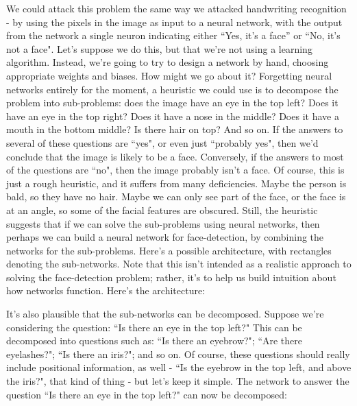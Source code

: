 We could attack this problem the same way we attacked handwriting recognition - by using the pixels in the image as input to a neural network, with the output from the network a single neuron indicating either ``Yes, it's a face'' or ``No, it's not a face".
Let's suppose we do this, but that we're not using a learning algorithm. Instead, we're going to try to design a network by hand, choosing appropriate weights and biases. How might we go about it? Forgetting neural networks entirely for the moment, a heuristic we could use is to decompose the problem into sub-problems: does the image have an eye in the top left? Does it have an eye in the top right? Does it have a nose in the middle? Does it have a mouth in the bottom middle? Is there hair on top? And so on.
If the answers to several of these questions are ``yes", or even just ``probably yes", then we'd conclude that the image is likely to be a face. Conversely, if the answers to most of the questions are ``no", then the image probably isn't a face.
Of course, this is just a rough heuristic, and it suffers from many deficiencies. Maybe the person is bald, so they have no hair. Maybe we can only see part of the face, or the face is at an angle, so some of the facial features are obscured. Still, the heuristic suggests that if we can solve the sub-problems using neural networks, then perhaps we can build a neural network for face-detection, by combining the networks for the sub-problems. Here's a possible architecture, with rectangles denoting the sub-networks. Note that this isn't intended as a realistic approach to solving the face-detection problem; rather, it's to help us build intuition about how networks function. Here's the architecture:

It's also plausible that the sub-networks can be decomposed. Suppose we're considering the question: ``Is there an eye in the top left?" This can be decomposed into questions such as: ``Is there an eyebrow?"; ``Are there eyelashes?"; ``Is there an iris?"; and so on. Of course, these questions should really include positional information, as well - ``Is the eyebrow in the top left, and above the iris?", that kind of thing - but let's keep it simple. The network to answer the question ``Is there an eye in the top left?" can now be decomposed:

